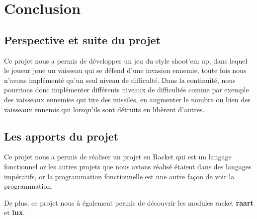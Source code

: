 \section{Conclusion}

\subsection{Perspective et suite du projet}
Ce projet nous a permis de développer un jeu du style shoot'em up, dans lequel le joueur joue un vaisseau qui se défend d'une invasion ennemie, toute fois nous n'avons implémenté qu'un seul niveau de difficulté. Dans la continuité, nous pourrions donc implémenter différents niveaux de difficultés comme par exemple des vaisseaux ennemies qui tire des missiles, en augmenter le nombre ou bien des vaisseaux ennemis qui lorsqu'ils sont détruits en libèrent d'autres.

\subsection{Les apports du projet}
Ce projet nous a permis de réaliser un projet en Racket qui est un langage fonctionnel or les autres projets que nous avions réalisé étaient dans des langages impératifs, or la programmation fonctionnelle est une autre façon de voir la programmation.

De plus, ce projet nous à également permis de découvrir les modules racket \textbf{raart} et \textbf{lux}.
